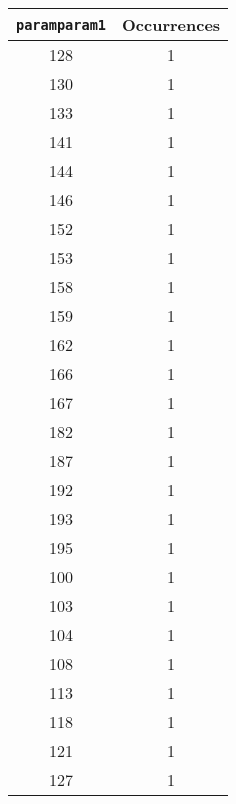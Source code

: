 \begin{longtable}{|c|c|}
\hline
\textbf{\texttt{paramparam1}} & \textbf{Occurrences} \\
\hline
128 & 1 \\
\hline
130 & 1 \\
\hline
133 & 1 \\
\hline
141 & 1 \\
\hline
144 & 1 \\
\hline
146 & 1 \\
\hline
152 & 1 \\
\hline
153 & 1 \\
\hline
158 & 1 \\
\hline
159 & 1 \\
\hline
162 & 1 \\
\hline
166 & 1 \\
\hline
167 & 1 \\
\hline
182 & 1 \\
\hline
187 & 1 \\
\hline
192 & 1 \\
\hline
193 & 1 \\
\hline
195 & 1 \\
\hline
100 & 1 \\
\hline
103 & 1 \\
\hline
104 & 1 \\
\hline
108 & 1 \\
\hline
113 & 1 \\
\hline
118 & 1 \\
\hline
121 & 1 \\
\hline
127 & 1 \\
\hline
\end{longtable}